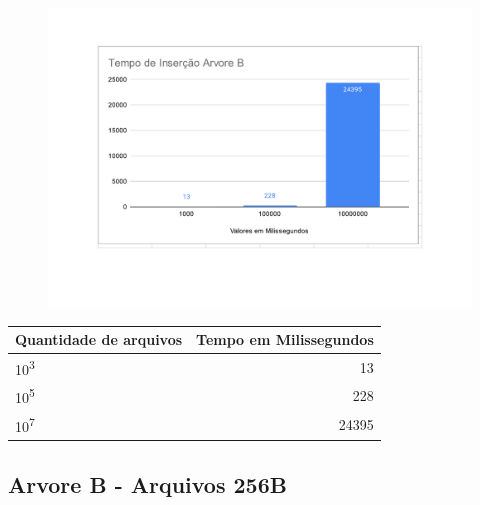 \begin{figure}[ht]
    \centering
    \includegraphics[scale=0.6]{Trabalho AED/fig/Planilha sem título - Página2.pdf}
    \label{fig:my_label}
\end{figure}
\begin{center}
        \begin{tabular}{| l | r |}
            \hline
            Quantidade de arquivos & Tempo em Milissegundos\\
            \hline
            10\textsuperscript{3} & 13\\
            10\textsuperscript{5} & 228\\
            10\textsuperscript{7} & 24395\\
            \hline
        \end{tabular}
    \end{center}
\subsection{Arvore B - Arquivos 256B}

